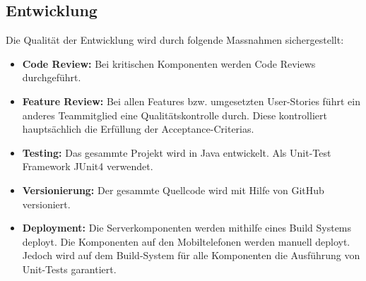 \subsection{Entwicklung}
Die Qualität der Entwicklung wird durch folgende Massnahmen sichergestellt:
\begin{itemize}
	\item{\textbf{Code Review:} Bei kritischen Komponenten werden Code Reviews durchgeführt.}
	
	\item{\textbf{Feature Review:} Bei allen Features bzw. umgesetzten User-Stories führt ein anderes Teammitglied eine Qualitätskontrolle durch. Diese kontrolliert hauptsächlich die Erfüllung der Acceptance-Criterias.}
	
	\item{\textbf{Testing:} Das gesammte Projekt wird in Java entwickelt. Als Unit-Test Framework JUnit4 verwendet.}
	
	\item{\textbf{Versionierung:} Der gesammte Quellcode wird mit Hilfe von GitHub versioniert.}
	
	\item{\textbf{Deployment:} Die Serverkomponenten werden mithilfe eines Build Systems deployt. Die Komponenten auf den Mobiltelefonen werden manuell deployt. Jedoch wird auf dem Build-System für alle Komponenten die Ausführung von Unit-Tests garantiert.}
	
\end{itemize}